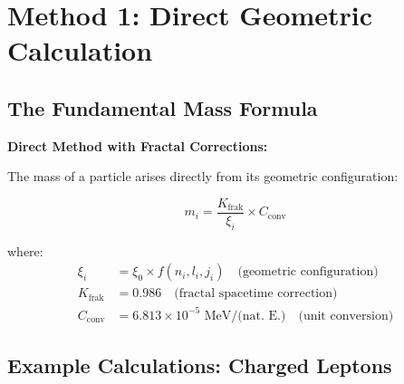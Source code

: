 \documentclass[12pt,a4paper]{article}
\begin{document}
	\section{Method 1: Direct Geometric Calculation}
	
	\subsection{The Fundamental Mass Formula}
	
	\begin{method}
		\textbf{Direct Method with Fractal Corrections:}
		
		The mass of a particle arises directly from its geometric configuration:
		
		\begin{equation}
			\boxed{m_i = \frac{K_{\text{frak}}}{\xi_i} \times C_{\text{conv}}}
			\label{eq:direct_mass}
		\end{equation}
		
		where:
		\begin{align}
			\xi_i &= \xi_0 \times f(n_i, l_i, j_i) \quad \text{(geometric configuration)} \\
			K_{\text{frak}} &= 0.986 \quad \text{(fractal spacetime correction)} \\
			C_{\text{conv}} &= 6.813 \times 10^{-5} \text{ MeV/(nat. E.)} \quad \text{(unit conversion)}
		\end{align}
	\end{method}
	
	\subsection{Example Calculations: Charged Leptons}
	
\end{document}
